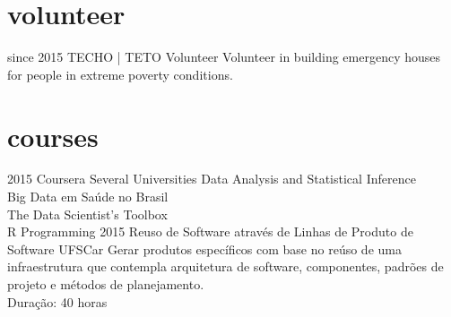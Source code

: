 \documentclass[]{friggeri-cv}
\begin{document}
\section{volunteer}

\begin{entrylist}
  \entry
    {since 2015}
    {TECHO | TETO}
    {Volunteer}
    {Volunteer in building emergency houses for people in extreme poverty conditions.}
\end{entrylist}

\section{courses}

\begin{entrylist}
  \entry
    {2015}
    {Coursera}
    {Several Universities}
    {Data Analysis and Statistical Inference \\
    Big Data em Saúde no Brasil \\
    The Data Scientist's Toolbox \\
    R Programming}
  \entry
    {2015}
    {Reuso de Software através de Linhas de Produto de Software}
    {UFSCar}
    {Gerar produtos específicos com base no reúso de uma infraestrutura que contempla arquitetura de software, componentes, padrões de projeto e métodos de planejamento. \\
    Duração: 40 horas}
\end{entrylist}
\end{document}
